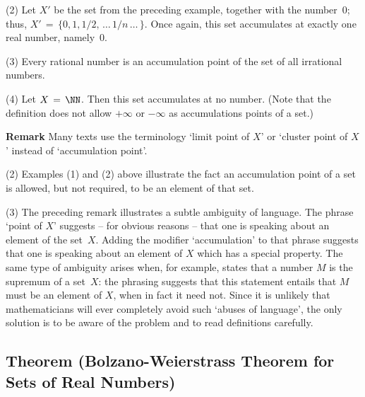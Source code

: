 \V

        (2) Let $X'$ be the set from the preceding example, together with the number~$0$; thus, $X' \,=\, \{0,1,1/2,\,{\ldots}\,1/n\,{\ldots}\,\}$.
    Once again, this set accumulates at exactly one real number, namely~$0$.

\V

        (3) Every rational number is an accumulation point of the set of all irrational numbers.

\V

        (4) Let $X \,=\, {\NN}$. Then this set accumulates at no number. (Note that the definition does not allow $+{\infty}$ or $-{\infty}$ as accumulations points of a set.)

\V

        {\bf Remark} Many texts use the terminology `limit point of $X$'
    or `cluster point of $X$' instead of `accumulation point'.


\V

        (2) Examples (1) and (2) above illustrate the fact an accumulation point of a set is allowed, but not required, to be an element of that set.

\V

        (3) The preceding remark illustrates a subtle ambiguity of language. The phrase `point of $X$' suggests
    -- for obvious reasons -- that one is speaking about an element of the set~$X$.
    Adding the modifier `accumulation' to that phrase suggests that one is speaking about an element of $X$ which has a special property.
    The same type of ambiguity arises when, for example, states that a number $M$ is the supremum of a set~$X$:
    the phrasing suggests that this statement entails that $M$ must be an element of $X$, when in fact it need not.
    Since it is unlikely that mathematicians will ever completely avoid such `abuses of language',
    the only solution is to be aware of the problem and to read definitions carefully.

\VV

            \subsection{\small{\bf Theorem} (Bolzano-Weierstrass Theorem for Sets of Real Numbers)}
            \label{ThmC40.70}

